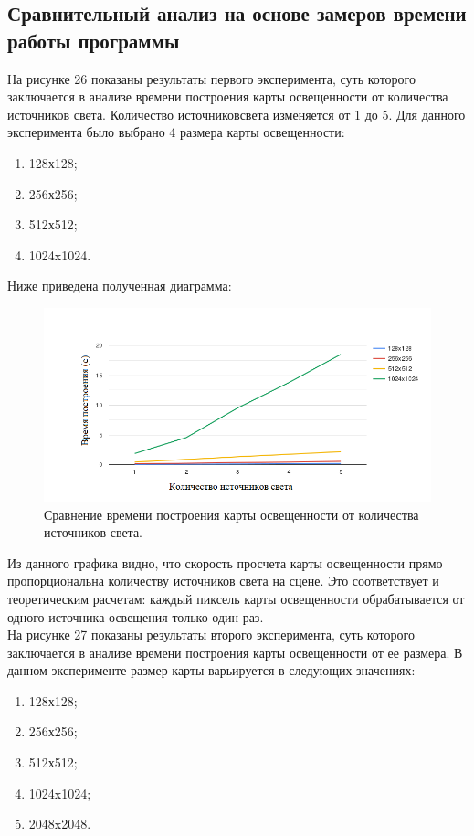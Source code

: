 \documentclass[a4paper, 10pt]{article}
\begin{document}
	\subsection{Сравнительный анализ на основе замеров времени работы программы}

	 \hspace*{5mm} На рисунке 26 показаны результаты первого эксперимента, суть которого заключается в анализе времени построения карты освещенности от количества источников света. Количество источниковсвета изменяется от 1 до 5. Для данного эксперимента было выбрано 4 размера карты освещенности: 
	 \begin{enumerate}
		\item 128х128;
		\item 256х256;
		\item 512х512;
		\item 1024x1024.
	\end{enumerate}
	 Ниже приведена полученная диаграмма:
	 \clearpage
	 \newpage
	\begin{figure}[t]
		\centering \includegraphics[scale=2]{chart1}
		\centering\caption{Сравнение времени построения карты освещенности от количества источников света.}
	\end{figure}
	\hspace*{5mm} Из данного графика видно, что скорость просчета карты освещенности прямо пропорциональна количеству источников света на сцене. Это соответствует и теоретическим расчетам: каждый пиксель карты освещенности обрабатывается от одного источника  освещения только один раз.
	\\ \hspace*{5mm}  На рисунке 27 показаны результаты второго эксперимента, суть которого заключается в анализе времени построения карты освещенности от ее размера. В данном эксперименте размер карты варьируется в следующих значениях:
	\begin{enumerate}
		\item 128х128;
		\item 256х256;
		\item 512х512;
		\item 1024x1024;
		\item 2048x2048.
	\end{enumerate}
\end{document}

